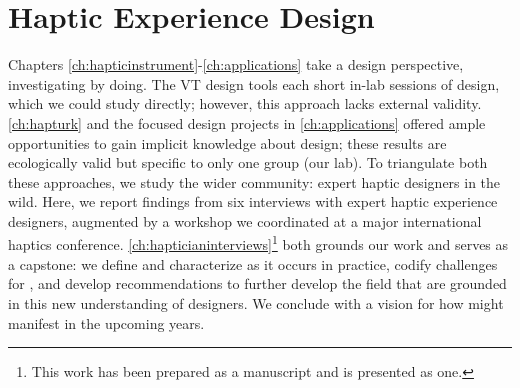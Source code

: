 
\chapter{Haptic Experience Design}
\label{ch:hapticianinterviews}

 Chapters \ref{ch:hapticinstrument}-\ref{ch:applications}  take a design perspective, investigating by doing.
The VT design tools each  short in-lab sessions of design, which we could study directly; however, this approach lacks external validity.
\autoref{ch:hapturk} and the focused design projects in \autoref{ch:applications} offered ample opportunities to gain implicit knowledge about design; these results are ecologically valid but specific to only one group (our lab).
To triangulate both these approaches, we study the wider community: expert haptic designers in the wild.
Here, we report findings from six interviews with expert haptic experience designers, augmented by a workshop we coordinated at a major international haptics conference.
\autoref{ch:hapticianinterviews}\footnote{This work has been prepared as a manuscript and is presented as one.} both grounds our work and serves as a capstone: we define and characterize \haxd as it occurs in practice, codify challenges for \haxd, and develop recommendations to further develop the field that are grounded in this new understanding of designers.
We conclude with a vision for how \haxd might manifest in the upcoming years.


